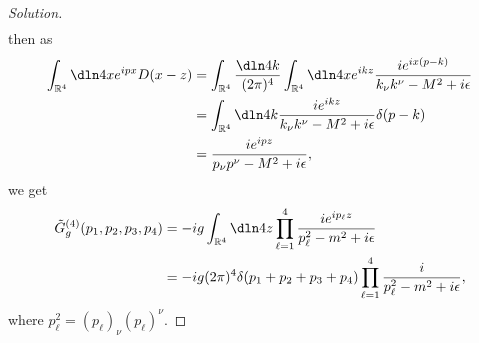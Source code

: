 \begin{proof}[Solution]
\begin{align*}
   \end{align*}
   then as
   \begin{align*}
      \int_{\mathbb{R}^4} \dln4x  e^{ipx} D(x - z) &= \int_{\mathbb{R}^4} \frac{\dln4k}{(2\pi)^4} \int_{\mathbb{R}^4}\dln4x e^{ikz} \frac{ie^{ix(p - k)}}{k_\nu k^\nu - M^2 + i \epsilon}\\
                                                   &= \int_{\mathbb{R}^4} \dln4k \frac{ie^{ikz}}{k_\nu k^\nu - M^2 + i \epsilon} \delta(p - k)\\
                                                   &= \frac{i e^{ipz}}{p_\nu p^\nu - M^2 + i \epsilon},
   \end{align*}
   we get
   \begin{align*}
      \tilde{G}_g^{(4)}(p_1, p_2, p_3, p_4) &= -ig \int_{\mathbb{R}^4} \dln4z \prod_{\ell = 1}^4{\frac{i e^{ip_\ell z}}{p_\ell^2 - m^2 + i \epsilon}}\\
                                            &= -ig (2\pi)^4 \delta(p_1 + p_2 + p_3 + p_4) \prod_{\ell = 1}^4{\frac{i}{p_\ell^2 - m^2 + i \epsilon}},
   \end{align*}
   where \(p_\ell^2 = (p_\ell)_\nu (p_\ell)^\nu.\)


\end{proof}
